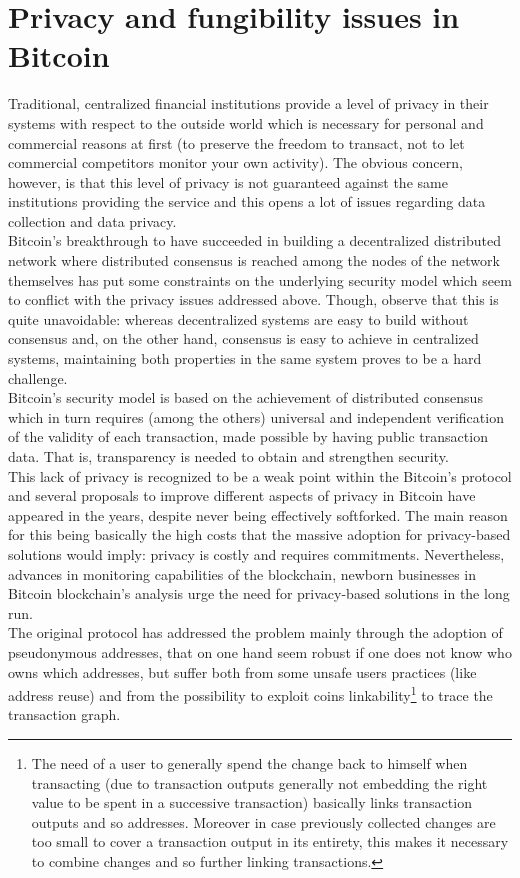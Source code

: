 \chapter{Privacy and fungibility issues in Bitcoin}
\label{chpr:priv_fung}
Traditional, centralized financial institutions provide a level of privacy in their systems with respect to the outside world which is necessary for personal and commercial reasons at first (to preserve the freedom to transact, not to let commercial competitors monitor your own activity). The obvious concern, however, is that this level of privacy is not guaranteed against the same institutions providing the service and this opens a lot of issues regarding data collection and data privacy. \\
Bitcoin's breakthrough to have succeeded in building a decentralized distributed network where distributed consensus is reached among the nodes of the network themselves has put some constraints on the underlying security model which seem to conflict with the privacy issues addressed above. Though, observe that this is quite unavoidable: whereas decentralized systems are easy to build without consensus and, on the other hand, consensus is easy to achieve in centralized systems, maintaining both properties in the same system proves to be a hard challenge.\\ 
Bitcoin's security model is based on the achievement of distributed consensus which in turn requires (among the others) universal and independent verification of the validity of each transaction, made possible by having public transaction data. That is, transparency is needed to obtain and strengthen security.\\
This lack of privacy is recognized to be a weak point within the Bitcoin's protocol and several proposals to improve different aspects of privacy in Bitcoin have appeared in the years, despite never being effectively softforked. The main reason for this being basically the high costs that the massive adoption for privacy-based solutions would imply: privacy is costly and requires commitments. Nevertheless, advances in monitoring capabilities of the blockchain, newborn businesses in Bitcoin blockchain's analysis urge the need for privacy-based solutions in the long run.\\
The original protocol has addressed the problem mainly through the adoption of pseudonymous addresses, that on one hand seem robust if one does not know who owns which addresses, but suffer both from some unsafe users practices (like address reuse) and from the possibility to exploit coins linkability\footnote{The need of a user to generally spend the change back to himself when transacting (due to transaction outputs generally not embedding the right value to be spent in a successive transaction) basically links transaction outputs and so addresses. Moreover in case previously collected changes are too small to cover a transaction output in its entirety, this makes it necessary to combine changes and so further linking transactions.} to trace the transaction graph.\\
